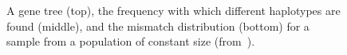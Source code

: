 \documentclass[12pt]{article}
\begin{document}
\begin{figure}
\begin{center}
\end{center}
\caption{A gene tree (top), the frequency with which different
  haplotypes are found (middle), and the mismatch distribution
  (bottom) for a sample from a population of constant size
  (from~\cite{Harpending-etal-1998}).}\label{fig:mismatch-constant} 
\end{figure}
\end{document}
